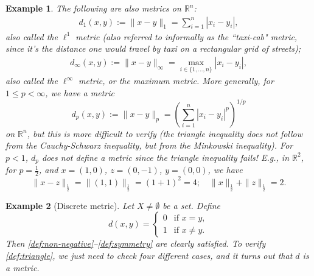 \documentclass[a4paper,reqno]{amsart}
\numberwithin{equation}{section}
\newtheorem{example}{Example}
\def\R{\mathbb{R}}
\begin{document}
\begin{example}
The following are also metrics on $\R^n$:
\begin{align*}
d_1(x,y):= \|x-y\|_1 = \sum_{i = 1}^n |x_i - y_i|,
\end{align*}
also called the $\ell^1$ metric (also referred to informally as the ``taxi-cab" metric, since it's the distance one would travel by taxi on a rectangular grid of streets);
\begin{align*}
d_\infty(x,y):= \|x-y\|_\infty = \max_{i \in \{1,\ldots,n\}} |x_i - y_i|,
\end{align*}
also called the $\ell^\infty$ metric, or the maximum metric.
More generally, for $1 \le p < \infty$, we have a metric
\[
d_p(x,y):= \|x-y\|_p = \left(\sum_{i = 1}^n |x_i - y_i|^p\right)^{1/p}
\]
on $\R^n$, but this is more difficult to verify (the triangle inequality does not follow from the Cauchy-Schwarz inequality, but from the Minkowski inequality).
For $p < 1$, $d_p$ does not define a metric since the triangle inequality fails! E.g., in $\R^2$, for $p=\frac12$, and $x=(1,0)$, $z=(0,-1)$, $y=(0,0)$, we have
$$
\|x-z\|_{\frac12} = \|(1,1)\|_{\frac12} = (1+1)^2 = 4; \quad \|x\|_{\frac12} + \|z\|_{\frac12} = 2.
$$
\end{example}

\begin{example}[Discrete metric] \label{discrete-metric}
Let $X \not= \emptyset$ be a set. Define
$$
d(x,y) = \begin{cases}
0 & \text{if } x=y, \\
1 & \text{if } x\neq y.
\end{cases}
$$
Then \eqref{def:non-negative}--\eqref{def:symmetry} are clearly satisfied. To
verify \eqref{def:triangle}, we just need to check four different cases, and it turns
out that $d$ is a metric.
\end{example}
\end{document}
